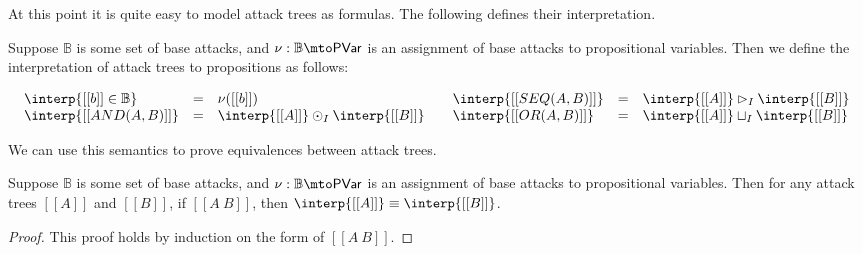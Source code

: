 At this point it is quite easy to model attack trees as formulas.  The
following defines their interpretation.
\begin{definition}
  \label{def:interp-aterms-quaternary}
  Suppose $\mathbb{B}$ is some set of base attacks, and $\nu :
  \mathbb{B} \mto \mathsf{PVar}$ is an assignment of base attacks to
  propositional variables.  Then we define the interpretation of
  attack trees to propositions as follows:
  \begin{center}
    \begin{math}
      \setlength{\arraycolsep}{5px}
      \begin{array}{lll}
        \begin{array}{lll}
          \interp{[[b]] \in \mathbb{B}} & = & \nu([[b]])\\
          \interp{[[AND(A, B)]]} & = & \interp{[[A]]} \odot_I \interp{[[B]]}
        \end{array}
        &
        \begin{array}{lll}
          \interp{[[SEQ(A,B)]]} & = & \interp{[[A]]} \rhd_I \interp{[[B]]}\\
          \interp{[[OR(A,B)]]} & = & \interp{[[A]]} \sqcup_I \interp{[[B]]}
        \end{array}
      \end{array}
    \end{math}
  \end{center}
\end{definition}
We can use this semantics to prove equivalences between attack trees.
\begin{lemma}
  \label{lemma:equivalence_of_attack_trees}
  Suppose $\mathbb{B}$ is some set of base attacks, and $\nu :
  \mathbb{B} \mto \mathsf{PVar}$ is an assignment of base attacks to
  propositional variables.  Then for any attack trees $[[A]]$ and
  $[[B]]$, if $[[A ~ B]]$, then $\interp{[[A]]} \equiv
  \interp{[[B]]}$.
\end{lemma}
\begin{proof}
  This proof holds by induction on the form of $[[A ~ B]]$.
\end{proof}

